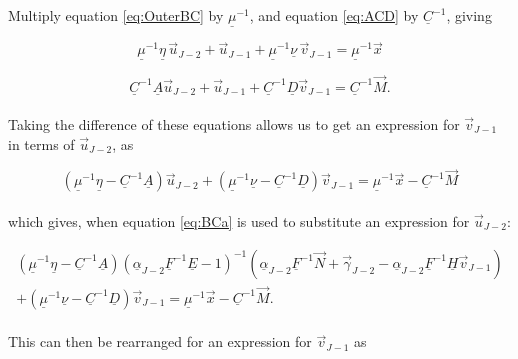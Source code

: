 \documentclass[11pt]{amsart}
\begin{document}
Multiply equation \ref{eq:OuterBC} by $\underline{\mu}^{-1}$, and equation \ref{eq:ACD} by $\underline{C}^{-1}$, giving

\begin{equation} \label{eq:BCb}
\underline{\mu}^{-1}  \underline{\eta} \, \vec{u}_{J-2} + \vec{u}_{J-1} + \underline{\mu}^{-1}  \underline{\nu} \, \vec{v}_{J-1} =  \underline{\mu}^{-1} \vec{x}
\end{equation}

\begin{equation} \label{eq:BCc}
\underline{C}^{-1}  \underline{A} \vec{u}_{J-2}  +  \vec{u}_{J-1}  +  \underline{C}^{-1} \underline{D} \vec{v}_{J-1}  =  \underline{C}^{-1}  \vec{M} .
\end{equation}
\\

Taking the difference of these equations allows us to get an expression for $\vec{v}_{J-1}$ in terms of $\vec{u}_{J-2}$, as

\begin{equation} \label{eq:BCd}
\left(  \underline{\mu}^{-1}  \underline{\eta}   -  \underline{C}^{-1}  \underline{A}  \right) \vec{u}_{J-2}  +  \left(  \underline{\mu}^{-1}  \underline{\nu}   -  \underline{C}^{-1} \underline{D} \right)  \vec{v}_{J-1}  =  \underline{\mu}^{-1} \vec{x}  -  \underline{C}^{-1}  \vec{M} 
\end{equation}
\\

which gives, when equation \ref{eq:BCa} is used to substitute an expression for $\vec{u}_{J-2}$:

\begin{multline} \label{eq:BCe}
\left(  \underline{\mu}^{-1}  \underline{\eta}   -  \underline{C}^{-1}  \underline{A}  \right) \left(  \underline{\alpha}_{J-2} \underline{F}^{-1} \underline{E}  -  1  \right)^{-1}   \left(  \underline{\alpha}_{J-2} \underline{F}^{-1} \vec{N}  +  \vec{\gamma}_{J-2}  -   \underline{\alpha}_{J-2} \underline{F}^{-1} \underline{H} \vec{v}_{J-1}  \right)  \\
+  \left(  \underline{\mu}^{-1}  \underline{\nu}   -  \underline{C}^{-1} \underline{D} \right)  \vec{v}_{J-1}  =  \underline{\mu}^{-1} \vec{x}  -  \underline{C}^{-1}  \vec{M}   .
\end{multline}
\\

This can then be rearranged for an expression for $\vec{v}_{J-1}$ as
\end{document}

